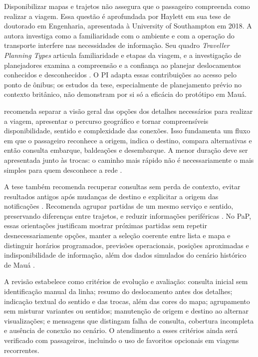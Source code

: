 \documentclass[12pt,oneside,a4paper,brazil,chapter=TITLE]{abntex2}
\begin{document}
Disponibilizar mapas e trajetos não assegura que o passageiro compreenda como realizar a viagem. Essa questão é aprofundada por Haylett em sua tese de doutorado em Engenharia, apresentada à University of Southampton em 2018. A autora investiga como a familiaridade com o ambiente e com a operação do transporte interfere nas necessidades de informação. Seu quadro \textit{Traveller Planning Types} articula familiaridade e etapas da viagem, e a investigação de planejadores examina a compreensão e a confiança ao planejar deslocamentos conhecidos e desconhecidos \citep{haylett2018}. O PI adapta essas contribuições ao acesso pelo ponto de ônibus; os estudos da tese, especialmente de planejamento prévio no contexto britânico, não demonstram por si só a eficácia do protótipo em Mauá.

\citet[p.~138--144]{haylett2018} recomenda separar a visão geral das opções dos detalhes necessários para realizar a viagem, apresentar o percurso geográfico e tornar compreensíveis disponibilidade, sentido e complexidade das conexões. Isso fundamenta um fluxo em que o passageiro reconhece a origem, indica o destino, compara alternativas e então consulta embarque, baldeações e desembarque. A menor duração deve ser apresentada junto às trocas: o caminho mais rápido não é necessariamente o mais simples para quem desconhece a rede \citep{haylett2018}.

A tese também recomenda recuperar consultas sem perda de contexto, evitar resultados antigos após mudanças de destino e explicitar a origem das notificações \citep[p.~144--152]{haylett2018}. Recomenda agrupar partidas de um mesmo serviço e sentido, preservando diferenças entre trajetos, e reduzir informações periféricas \citep[p.~152--156]{haylett2018}. No PaP, essas orientações justificam mostrar próximas partidas sem repetir desnecessariamente opções, manter a seleção coerente entre lista e mapa e distinguir horários programados, previsões operacionais, posições aproximadas e indisponibilidade de informação, além dos dados simulados do cenário histórico de Mauá \citep{haylett2018}.

A revisão estabelece como critérios de evolução e avaliação: consulta inicial sem identificação manual da linha; resumo do deslocamento antes dos detalhes; indicação textual do sentido e das trocas, além das cores do mapa; agrupamento sem misturar variantes ou sentidos; manutenção de origem e destino ao alternar visualizações; e mensagens que distingam falha de consulta, cobertura incompleta e ausência de conexão no cenário. O atendimento a esses critérios ainda será verificado com passageiros, incluindo o uso de favoritos opcionais em viagens recorrentes.
\end{document}
